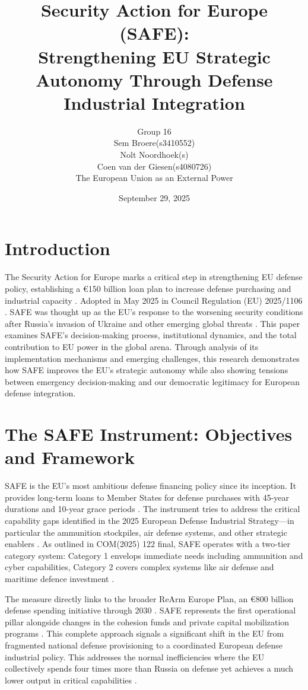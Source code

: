 \documentclass[12pt,a4paper]{article}
\title{Security Action for Europe (SAFE):\\ Strengthening EU Strategic Autonomy Through Defense Industrial Integration}
\author{%
  Group 16\\[0.5em]
  Sem Broere(s3410552)\\
  Nolt Noordhoek(s)\\
  Coen van der Giesen(s4080726)\\[1em]
  The European Union as an External Power
}
\date{September 29, 2025}
\begin{document}
\maketitle

\section*{Introduction}
\noindent The Security Action for Europe marks a critical step in strengthening EU defense policy, establishing a €150 billion loan plan to increase defense purchasing and industrial capacity \parencite{commission2025proposal}. Adopted in May 2025 in Council Regulation (EU) 2025/1106 \parencite{eurlex2025,council2025safe}. SAFE was thought up as the EU's response to the worsening security conditions after Russia's invasion of Ukraine and other emerging global threats \parencite{commission2025proposal}. This paper examines SAFE's decision-making process, institutional dynamics, and the total contribution to EU power in the global arena. Through analysis of its implementation mechanisms and emerging challenges, this research demonstrates how SAFE improves the EU's strategic autonomy while also showing tensions between emergency decision-making and our democratic legitimacy for European defense integration.

\section*{The SAFE Instrument: Objectives and Framework}
\noindent SAFE is the EU’s most ambitious defense financing policy since its inception. It provides long-term loans to Member States for defense purchases with 45-year durations and 10-year grace periods \parencite{commission2025proposal}. The instrument tries to address the critical capability gaps identified in the 2025 European Defense Industrial Strategy---in particular the ammunition stockpiles, air defense systems, and other strategic enablers \parencite{commission2025safe}. As outlined in COM(2025) 122 final, SAFE operates with a two-tier category system: Category 1 envelops immediate needs including ammunition and cyber capabilities, Category 2 covers complex systems like air defense and maritime defence investment \parencite{commission2025safe}.

\noindent The measure directly links to the broader ReArm Europe Plan, an €800 billion defense spending initiative through 2030 \parencite{euronews2025}. SAFE represents the first operational pillar alongside changes in the cohesion funds and private capital mobilization programs \parencite{euronews2025}. This complete approach signals a significant shift in the EU from fragmented national defense provisioning to a coordinated European defense industrial policy. This addresses the normal inefficiencies where the EU collectively spends four times more than Russia on defense yet achieves a much lower output in critical capabilities \parencite{euronews2025}.
\end{document}
